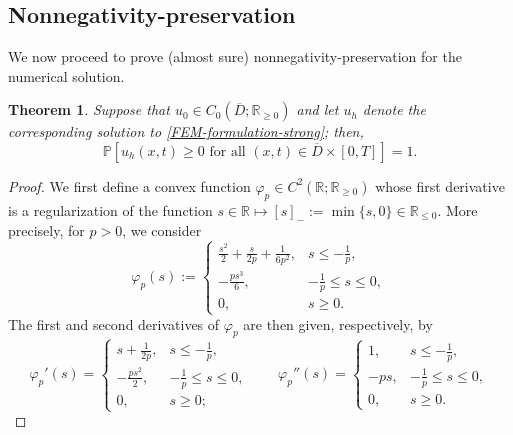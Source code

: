 \documentclass[12pt]{article}
\newtheorem{theorem}{Theorem}[section]
\begin{document}
{\subsection{Nonnegativity-preservation}

We now proceed to prove (almost sure) nonnegativity-preservation for the numerical solution.
\begin{theorem}
\label{thm:nonnegativity}
   Suppose that $u_0 \in C_0(\overline{D};\mathbb{R}_{\geq 0})$ and let $u_h$ denote the corresponding solution to \eqref{FEM-formulation-strong}; then,
\begin{equation}
        \mathbb{P} \left[u_h(x,t) \geq 0\, \,\mbox{for all $(x,t) \in \overline{D} \times [0,T]$} \right] = 1.
    \end{equation}
\end{theorem}
\begin{proof}
     We first define a convex function $\varphi_p \in C^2(\mathbb{R};\mathbb{R}_{\geq 0})$ whose first derivative is a regularization of the function $s \in \mathbb{R} \mapsto [s]_{-}:= \min\{s,0\} \in \mathbb{R}_{\leq 0}$. More precisely, for $p > 0$, we consider
%
\[ \varphi_p(s) := \begin{cases} 
      \frac{s^2}{2} + \frac{s}{2p} + \frac{1}{6p^2}, & s\leq - \frac{1}{p}, \\
      -\frac{ps^3}{6}, & -\frac{1}{p}\leq s\leq 0, \\
      0, & s \geq 0. 
   \end{cases}
\]
%
The first and second derivatives of $\varphi_p$ are then given, respectively, by
%
\[
\varphi_p'(s) = \begin{cases} 
      s + \frac{1}{2p},  & s\leq - \frac{1}{p}, \\
      -\frac{ps^2}{2}, & -\frac{1}{p}\leq s\leq 0, \\
      0, & s \geq 0; 
   \end{cases}
   \qquad 
\varphi_p''(s) = \begin{cases} 
      1,  & s\leq - \frac{1}{p}, \\
      -ps, & -\frac{1}{p}\leq s\leq 0, \\
      0, & s \geq 0. 
   \end{cases}
\]
%  

  


\end{proof}}
\end{document}
